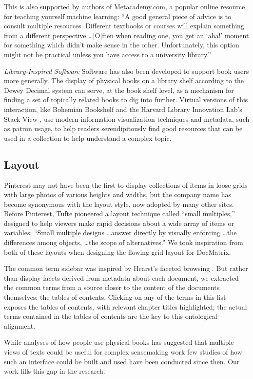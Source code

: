This is also supported by authors of Metacademy.com, a popular online resource for teaching yourself machine learning: ``A good general piece of advice is to consult multiple resources. Different textbooks or courses will explain something from a different perspective \ldots [O]ften when reading one, you get an ‘aha!’ moment for something which didn't make sense in the other. Unfortunately, this option might not be practical unless you have access to a university library.'' \cite{metacademy}



\textit{Library-Inspired Software}  \hspace{2 mm}
Software has also been developed to support book users more generally. The display of physical books on a library shelf according to the Dewey Decimal system can serve, at the book shelf level, as a mechanism for finding a set of topically related books to dig into further. Virtual versions of this interaction, like Bohemian Bookshelf \cite{bohemian} and the Harvard Library Innovation Lab's Stack View \cite{stackview}, use modern information visualization techniques and metadata, such as patron usage, to help readers serendipitously find good resources that can be used in a collection to help understand a complex topic.

\subsection{Layout}
Pinterest may not have been the first to display collections of items in loose grids with large photos of various heights and widths, but the company name has become synonymous with the layout style, now adopted by many other sites. Before Pinterest, Tufte pioneered a layout technique called ``small multiples,'' designed to help viewers make rapid decisions about a wide array of items or variables: ``Small multiple designs \ldots answer directly by visually enforcing \ldots the differences among objects, \ldots the scope of alternatives.'' We took inspiration from both of these layouts when designing the flowing grid layout for DocMatrix. 

The common term sidebar was inspired by Hearst's faceted browsing \cite{facets}. But rather than display facets derived from metadata about each document, we extracted the common terms from a source closer to the content of the documents themselves: the tables of contents. Clicking on any of the terms in this list exposes the tables of contents, with relevant chapter titles highlighted; the actual terms contained in the tables of contents are the key to this ontological alignment.

While analyses of how people use physical books has suggested that multiple views of texts could be useful for complex sensemaking work \cite{ohara,adler} few studies of how such an interface could be built and used have been conducted since then. Our work fills this gap in the research.
